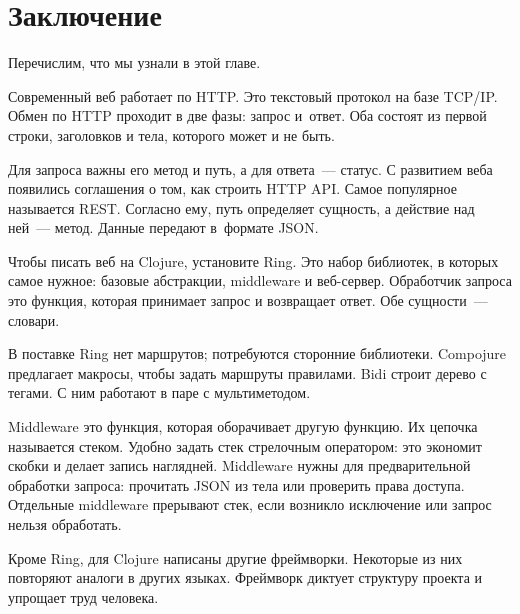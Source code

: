 \section{Заключение}

Перечислим, что мы узнали в этой главе.

Современный веб работает по HTTP. Это текстовый протокол на базе TCP/IP. Обмен
по HTTP проходит в две фазы: запрос и~ответ. Оба состоят из первой строки,
заголовков и тела, которого может и не быть.

Для запроса важны его метод и путь, а для ответа~--- статус. С развитием веба
появились соглашения о том, как строить HTTP API. Самое популярное называется
REST. Согласно ему, путь определяет сущность, а действие над ней~---
метод. Данные передают в~формате JSON.

Чтобы писать веб на Clojure, установите Ring. Это набор библиотек, в которых
самое нужное: базовые абстракции, middleware и веб-сервер. Обработчик запроса
это функция, которая принимает запрос и возвращает ответ. Обе сущности~---
словари.

В поставке Ring нет маршрутов; потребуются сторонние библиотеки. Compojure
предлагает макросы, чтобы задать маршруты правилами. Bidi строит дерево с
тегами. С ним работают в паре с мультиметодом.

Middleware это функция, которая оборачивает другую функцию. Их цепочка
называется стеком. Удобно задать стек стрелочным оператором: это экономит скобки
и делает запись наглядней. Middleware нужны для предварительной обработки
запроса: прочитать JSON из тела или проверить права доступа. Отдельные middleware
прерывают стек, если возникло исключение или запрос нельзя обработать.

Кроме Ring, для Clojure написаны другие фреймворки. Некоторые из них повторяют
аналоги в других языках. Фреймворк диктует структуру проекта и упрощает труд
человека.
